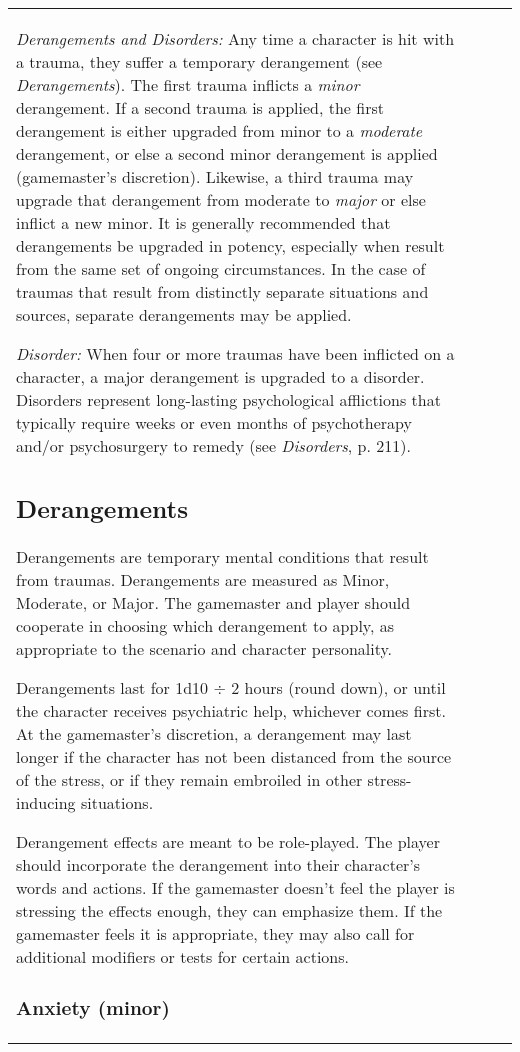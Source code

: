 \begin{table}
\begin{tabular}{|p{8cm}|r|r|r|}
\emph{Derangements and Disorders:} Any time a character is hit with a trauma, they suffer a temporary derangement (see \emph{Derangements}). The first trauma inflicts a \emph{minor} derangement. If a second trauma is applied, the first derangement is either upgraded from minor to a \emph{moderate} derangement, or else a second minor derangement is applied (gamemaster’s discretion). Likewise, a third trauma may upgrade that derangement from moderate to \emph{major} or else inflict a new minor. It is generally recommended that derangements be upgraded in potency, especially when result from the same set of ongoing circumstances. In the case of traumas that result from distinctly separate situations and sources, separate derangements may be applied. 

\emph{Disorder:} When four or more traumas have been inflicted on a character, a major derangement is upgraded to a disorder. Disorders represent long-lasting psychological afflictions that typically require weeks or even months of psychotherapy and/or psychosurgery to remedy (see \emph{Disorders}, p. 211). 



\subsection{Derangements} \label{sec:derangements} 

Derangements are temporary mental conditions that result from traumas. Derangements are measured as Minor, Moderate, or Major. The gamemaster and player should cooperate in choosing which derangement to apply, as appropriate to the scenario and character personality. 

Derangements last for 1d10 $\div$ 2 hours (round down), or until the character receives psychiatric help, whichever comes first. At the gamemaster’s discretion, a derangement may last longer if the character has not been distanced from the source of the stress, or if they remain embroiled in other stress-inducing situations. 

Derangement effects are meant to be role-played. The player should incorporate the derangement into their character’s words and actions. If the gamemaster doesn’t feel the player is stressing the effects enough, they can emphasize them. If the gamemaster feels it is appropriate, they may also call for additional modifiers or tests for certain actions. 

\subsubsection{Anxiety (minor)} 


\end{tabular}
\end{table}

